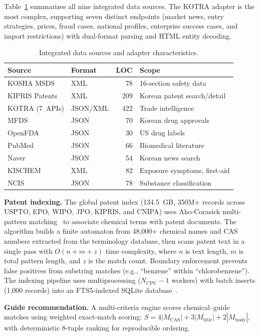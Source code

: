 \documentclass[preprint,12pt]{elsarticle}
\begin{document}
Table~\ref{tab:sources} summarizes all nine integrated data sources.
The KOTRA adapter is the most complex, supporting seven distinct endpoints (market news, entry strategies, prices, fraud cases, national profiles, enterprise success cases, and import restrictions) with dual-format parsing and HTML entity decoding.

\begin{table}[H]
\centering
\caption{Integrated data sources and adapter characteristics.}
\label{tab:sources}
\small
\begin{tabular}{@{}llrl@{}}
\toprule
\textbf{Source} & \textbf{Format} & \textbf{LOC} & \textbf{Scope} \\
\midrule
KOSHA MSDS & XML & 78 & 16-section safety data \\
KIPRIS Patents & XML & 209 & Korean patent search/detail \\
KOTRA (7~APIs) & JSON/XML & 422 & Trade intelligence \\
MFDS & JSON & 70 & Korean drug approvals \\
OpenFDA & JSON & 30 & US drug labels \\
PubMed & JSON & 66 & Biomedical literature \\
Naver & JSON & 54 & Korean news search \\
KISCHEM & XML & 82 & Exposure symptoms, first-aid \\
NCIS & JSON & 78 & Substance classification \\
\bottomrule
\end{tabular}
\end{table}

\textbf{Patent indexing.}
The global patent index (134.5~GB, 350M+ records across USPTO, EPO, WIPO, JPO, KIPRIS, and CNIPA) uses Aho-Corasick multi-pattern matching~\cite{ahocorasick} to associate chemical terms with patent documents.
The algorithm builds a finite automaton from 48,000+ chemical names and CAS numbers extracted from the terminology database, then scans patent text in a single pass with $O(n + m + z)$ time complexity, where $n$ is text length, $m$ is total pattern length, and $z$ is the match count.
Boundary enforcement prevents false positives from substring matches (e.g., ``benzene'' within ``chlorobenzene'').
The indexing pipeline uses multiprocessing ($N_{\text{CPU}} - 1$ workers) with batch inserts (1,000 records) into an FTS5-indexed SQLite database~\cite{sqlite_fts5}.

\textbf{Guide recommendation.}
A multi-criteria engine scores chemical--guide matches using weighted exact-match scoring: $S = 4|M_{\text{CAS}}| + 3|M_{\text{title}}| + 2|M_{\text{body}}|$, with deterministic 8-tuple ranking for reproducible ordering.
\end{document}
